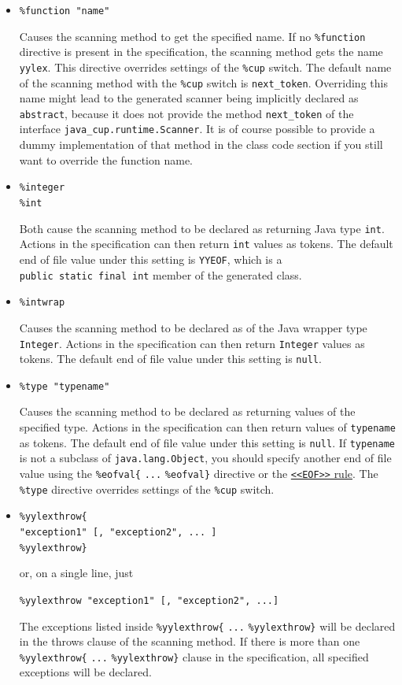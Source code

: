 \begin{itemize}
\item
  \texttt{\%function\ "name"}

  Causes the scanning method to get the specified name. If no
  \texttt{\%function} directive is present in the specification, the
  scanning method gets the name \texttt{yylex}. This directive overrides
  settings of the \texttt{\%cup} switch. The default name of the
  scanning method with the \texttt{\%cup} switch is
  \texttt{next\_token}. Overriding this name might lead to the generated
  scanner being implicitly declared as \texttt{abstract}, because it
  does not provide the method \texttt{next\_token} of the interface
  \texttt{java\_cup.runtime.Scanner}. It is of course possible to
  provide a dummy implementation of that method in the class code
  section if you still want to override the function name.
\item
  \texttt{\%integer}\\\texttt{\%int}

  Both cause the scanning method to be declared as returning Java type
  \texttt{int}. Actions in the specification can then return
  \texttt{int} values as tokens. The default end of file value under
  this setting is \texttt{YYEOF}, which is a
  \texttt{public\ static\ final\ int} member of the generated class.
\item
  \texttt{\%intwrap}

  Causes the scanning method to be declared as of the Java wrapper type
  \texttt{Integer}. Actions in the specification can then return
  \texttt{Integer} values as tokens. The default end of file value under
  this setting is \texttt{null}.
\item
  \texttt{\%type\ "typename"}

  Causes the scanning method to be declared as returning values of the
  specified type. Actions in the specification can then return values of
  \texttt{typename} as tokens. The default end of file value under this
  setting is \texttt{null}. If \texttt{typename} is not a subclass of
  \texttt{java.lang.Object}, you should specify another end of file
  value using the \texttt{\%eofval\{} \texttt{...} \texttt{\%eofval\}}
  directive or the
  \hyperref[Grammar]{\texttt{\textless{}\textless{}EOF\textgreater{}\textgreater{}}
  rule}. The \texttt{\%type} directive overrides settings of the
  \texttt{\%cup} switch.
\item
  \texttt{\%yylexthrow\{}\\\texttt{"exception1"\ {[},\ "exception2",\ ...\ {]}}\\\texttt{\%yylexthrow\}}

  or, on a single line, just

  \texttt{\%yylexthrow\ "exception1"\ {[},\ "exception2",\ ...{]}}

  The exceptions listed inside \texttt{\%yylexthrow\{} \texttt{...}
  \texttt{\%yylexthrow\}} will be declared in the throws clause of the
  scanning method. If there is more than one \texttt{\%yylexthrow\{}
  \texttt{...} \texttt{\%yylexthrow\}} clause in the specification, all
  specified exceptions will be declared.
\end{itemize}


